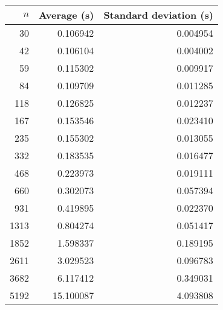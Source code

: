 \begin{tabular}{rrr}
$n$ & Average (s) & Standard deviation (s)\\\hline
30 & 0.106942 & 0.004954\\
42 & 0.106104 & 0.004002\\
59 & 0.115302 & 0.009917\\
84 & 0.109709 & 0.011285\\
118 & 0.126825 & 0.012237\\
167 & 0.153546 & 0.023410\\
235 & 0.155302 & 0.013055\\
332 & 0.183535 & 0.016477\\
468 & 0.223973 & 0.019111\\
660 & 0.302073 & 0.057394\\
931 & 0.419895 & 0.022370\\
1313 & 0.804274 & 0.051417\\
1852 & 1.598337 & 0.189195\\
2611 & 3.029523 & 0.096783\\
3682 & 6.117412 & 0.349031\\
5192 & 15.100087 & 4.093808\\
\end{tabular}
